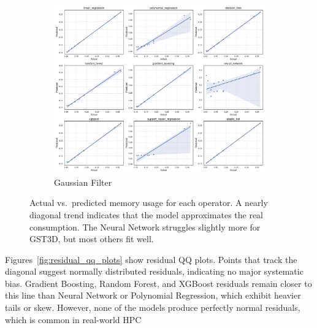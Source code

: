 \begin{figure}[htbp]
    \begin{subfigure}[t]{0.32\textwidth}
        \includegraphics[width=\textwidth]{assets/images/05/actual_vs_predicted_by_model_gaussian-filter}
        \caption{Gaussian Filter}
    \end{subfigure}
    \caption{Actual vs.\ predicted memory usage for each operator.
    A nearly diagonal trend indicates that the model approximates the real consumption.
    The Neural Network struggles slightly more for \ac{GST3D}, but most others fit well.}
    \label{fig:actual_vs_predicted}
\end{figure}

Figures~\ref{fig:residual_qq_plots} show residual \ac{QQ} plots.
Points that track the diagonal suggest normally distributed residuals, indicating no major systematic bias.
Gradient Boosting, Random Forest, and XGBoost residuals remain closer to this line than Neural Network or Polynomial Regression, which exhibit heavier tails or skew.
However, none of the models produce perfectly normal residuals, which is common in real-world \ac{HPC} 

